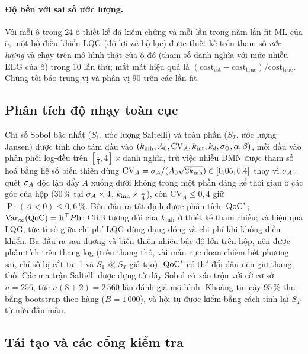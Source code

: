 \paragraph{Độ bền với sai số ước lượng.} Với mỗi ô trong 24 ô thiết kế đã kiểm chứng và mỗi lần trong năm lần fit ML của ô, một bộ điều khiển LQG (độ lợi \emph{và} bộ lọc) được thiết kế trên tham số \emph{ước lượng} và chạy trên mô hình thật của ô đó (tham số danh nghĩa với mức nhiễu EEG của ô) trong 10 lần thử; mất mát hiệu quả là $(\mathrm{cost}_{\mathrm{est}}-\mathrm{cost}_{\mathrm{true}})/\mathrm{cost}_{\mathrm{true}}$. Chúng tôi báo trung vị và phân vị 90 trên các lần fit.

\subsection{Phân tích độ nhạy toàn cục}
\label{sec:sobol-methods}

Chỉ số Sobol bậc nhất ($S_1$, ước lượng Saltelli) và toàn phần ($S_T$, ước lượng Jansen) \citep{Sobol1993,Jansen1999,Saltelli2010} được tính cho tám đầu vào $(k_{\mathrm{inh}},A_0,\mathrm{CV}_A,k_{\mathrm{int}},k_{d},\sigma_{\Phi},\alpha,\beta)$, mỗi đầu vào phân phối log-đều trên $[\tfrac14,4]\times$danh nghĩa, trừ việc nhiễu DMN được tham số hoá bằng hệ số biến thiên dừng $\mathrm{CV}_A=\sigma_{A}/(A_0\sqrt{2k_{\mathrm{inh}}})\in[0{,}05,0{,}4]$ thay vì $\sigma_{A}$: quét $\sigma_{A}$ độc lập đẩy $A$ xuống dưới không trong một phần đáng kể thời gian ở các góc của hộp (30\,\% tại $\sigma_{A}\times4$, $k_{\mathrm{inh}}\times\tfrac14$), còn $\mathrm{CV}_A\le0{,}4$ giữ $\Pr(A<0)\le0{,}6\,\%$. Bốn đầu ra tất định được phân tích: $\mathrm{QoC}^*$; $\operatorname{Var}_\infty(\mathrm{QoC})=\mathbf{h}^\top P\mathbf{h}$; CRB tương đối của $k_{\mathrm{inh}}$ ở thiết kế tham chiếu; và hiệu quả LQG, tức tỉ số giữa chi phí LQG dừng dạng đóng và chi phí khi không điều khiển. Ba đầu ra sau dương và biến thiên nhiều bậc độ lớn trên hộp, nên được phân tích trên thang log (trên thang thô, vài mẫu cực đoan chiếm hết phương sai, chỉ số bị cắt tại 1 và $S_1\ll S_T$ giả tạo); $\mathrm{QoC}^*$ có thể đổi dấu nên giữ thang thô. Các ma trận Saltelli được dựng từ dãy Sobol có xáo trộn \citep{Owen1998} với cỡ cơ sở $n=256$, tức $n(8+2)=2\,560$ lần đánh giá mô hình. Khoảng tin cậy 95\,\% thu bằng bootstrap theo hàng ($B=1\,000$), và hội tụ được kiểm bằng cách tính lại $S_T$ từ nửa đầu mẫu.

\subsection{Tái tạo và các cổng kiểm tra}
\label{sec:repro}

